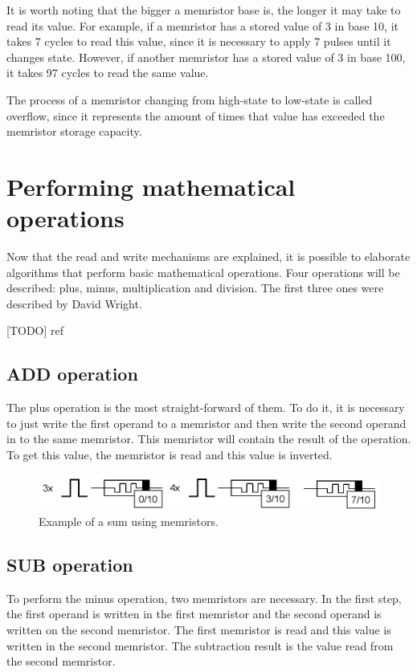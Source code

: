 \documentclass[ecp,tc,english]{iiufrgs}
\begin{document}
It is worth noting that the bigger a memristor base is, the longer it may take to read its value. For example, if a memristor has a stored value of 3 in base 10, it takes 7 cycles to read this value, since it is necessary to apply 7 pulses until it changes state. However, if another memristor has a stored value of 3 in base 100, it takes 97 cycles to read the same value.

The process of a memristor changing from high-state to low-state is called overflow, since it represents the amount of times that value has exceeded the memristor storage capacity.

\chapter{Performing mathematical operations}

Now that the read and write mechanisms are explained, it is possible to elaborate algorithms that perform basic mathematical operations. Four operations will be described: plus, minus, multiplication and division. The first three ones were described by David Wright.

[TODO] ref

\section{ADD operation}

The plus operation is the most straight-forward of them. To do it, it is necessary to just write the first operand to a memristor and then write the second operand in to the same memristor. This memristor will contain the result of the operation. To get this value, the memristor is read and this value is inverted.

\begin{figure}
  \caption{Example of a sum using memristors.}
  \centerline{\includegraphics{fig/basicadd.png}}
  \label{fig:basicadd}
\end{figure}

\section{SUB operation}

To perform the minus operation, two memristors are necessary. In the first step, the first operand is written in the first memristor and the second operand is written on the second memristor. The first memristor is read and this value is written in the second memristor. The subtraction result is the value read from the second memristor.
\end{document}
